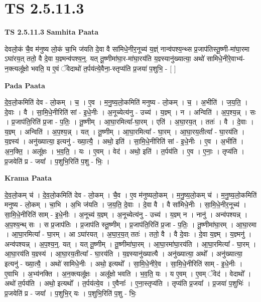 \documentclass[17pt]{extarticle}
\begin{document}
\section*{ TS 2.5.11.3 }

\textbf{TS 2.5.11.3 } \newline
\textbf{Samhita Paata} \newline

देवलो॒कं चै॒व म॑नुष्य लो॒कं चा॒भि ज॑यति दे॒वा वै सा॑मिधे॒नीर॒नूच्य॑ य॒ज्ञ्ं नान्व॑पश्य॒न्थ्स प्र॒जाप॑तिस्तू॒ष्णी-मा॑घा॒रमा ऽघा॑रय॒त् ततो॒ वै दे॒वा य॒ज्ञ्मन्व॑पश्य॒न्॒. यत् तू॒ष्णीमा॑घा॒र-मा॑घा॒रय॑ति य॒ज्ञ्स्यानु॑ख्यात्या॒ अथो॑ सामिधे॒नीरे॒वाभ्य॑-न॒क्त्यलू᳚क्षो भवति॒ य ए॒वं ॅवेदाथो॑ त॒र्पय॑त्ये॒वैना॒-स्तृप्य॑ति प्र॒जया॑ प॒शुभि॒ - [  ] \newline

\textbf{Pada Paata} \newline

दे॒व॒लो॒कमिति॑ देव - लो॒कम् । च॒ । ए॒व । म॒नु॒ष्य॒लो॒कमिति॑ मनुष्य - लो॒कम् । च॒ । अ॒भीति॑ । ज॒य॒ति॒ । दे॒वाः । वै । सा॒मि॒धे॒नीरिति॑ सां - इ॒धे॒नीः । अ॒नूच्येत्य॑नु - उच्य॑ । य॒ज्ञ्म् । न । अन्विति॑ । अ॒प॒श्य॒न्न् । सः । प्र॒जाप॑ति॒रिति॑ प्र॒जा - प॒तिः॒ । तू॒ष्णीम् । आ॒घा॒रमित्या᳚-घा॒रम् । एति॑ । अ॒घा॒रय॒त् । ततः॑ । वै । दे॒वाः । य॒ज्ञ्म् । अन्विति॑ । अ॒प॒श्य॒न्न् । यत् । तू॒ष्णीम् । आ॒घा॒रमित्या᳚ - घा॒रम् । आ॒घा॒रय॒तीत्या᳚ - घा॒रय॑ति । य॒ज्ञ्स्य॑ । अनु॑ख्यात्या॒ इत्यनु॑ - ख्या॒त्यै॒ । अथो॒ इति॑ । सा॒मि॒धे॒नीरिति॑ सां - इ॒धे॒नीः । ए॒व । अ॒भीति॑ । अ॒न॒क्ति॒ । अलू᳚क्षः । भ॒व॒ति॒ । यः । ए॒वम् । वेद॑ । अथो॒ इति॑ । त॒र्पय॑ति । ए॒व । ए॒नाः॒ । तृप्य॑ति । प्र॒जयेति॑ प्र - जया᳚ । प॒शुभि॒रिति॑ प॒शु - भिः॒ ।  \newline


\textbf{Krama Paata} \newline

दे॒व॒लो॒कम् च॑ । दे॒व॒लो॒कमिति॑ देव - लो॒कम् । चै॒व । ए॒व म॑नुष्यलो॒कम् । म॒नु॒ष्य॒लो॒कम् च॑ । म॒नु॒ष्य॒लो॒कमिति॑ मनुष्य - लो॒कम् । चा॒भि । अ॒भि ज॑यति । ज॒य॒ति॒ दे॒वाः । दे॒वा वै । वै सा॑मिधे॒नीः । सा॒मि॒धे॒नीर॒नूच्य॑ । सा॒मि॒धे॒नीरिति॑ साम् - इ॒धे॒नीः । अ॒नूच्य॑ य॒ज्ञ्म् । अ॒नूच्येत्य॑नु - उच्य॑ । य॒ज्ञ्म् न । नानु॑ । अन्व॑पश्यन्न् । अ॒प॒श्य॒न्थ् सः । स प्र॒जाप॑तिः । प्र॒जाप॑ति स्तू॒ष्णीम् । प्र॒जाप॑ति॒रिति॑ प्र॒जा - प॒तिः॒ । तू॒ष्णीमा॑घा॒रम् । आ॒घा॒रमा । आ॒घा॒रमित्या᳚ - घा॒रम् । आ ऽघा॑रयत् । अ॒घा॒र॒य॒त् ततः॑ । ततो॒ वै । वै दे॒वाः । दे॒वा य॒ज्ञ्म् । य॒ज्ञ्मनु॑ । अन्व॑पश्यन्न् । अ॒प॒श्य॒न्॒. यत् । यत् तू॒ष्णीम् । तू॒ष्णीमा॑घा॒रम् । आ॒घा॒रमा॑घा॒रय॑ति । आ॒घा॒रमित्या᳚ - घा॒रम् । आ॒घा॒रय॑ति य॒ज्ञ्स्य॑ । आ॒घा॒रय॒तीत्या᳚ - घा॒रय॑ति । य॒ज्ञ्स्यानु॑ख्यात्यै । अनु॑ख्यात्या॒ अथो᳚ । अनु॑ख्यात्या॒ इत्यनु॑ - ख्या॒त्यै॒ । अथो॑ सामिधे॒नीः । अथो॒ इत्यथो᳚ । सा॒मि॒धे॒नीरे॒व । सा॒मि॒धे॒नीरिति॑ साम् - इ॒धे॒नीः । ए॒वाभि । अ॒भ्य॑नक्ति । अ॒न॒क्त्यलू᳚क्षः । अलू᳚क्षो भवति । भ॒व॒ति॒ यः । य ए॒वम् । ए॒वम् ॅवेद॑ । वेदाथो᳚ । अथो॑ त॒र्पय॑ति । अथो॒ इत्यथो᳚ । त॒र्पय॑त्ये॒व । ए॒वैनाः᳚ । ए॒ना॒स्तृप्य॑ति । तृप्य॑ति प्र॒जया᳚ । प्र॒जया॑ प॒शुभिः॑ । प्र॒जयेति॑ प्र - जया᳚ । प॒शुभि॒र् यः । प॒शुभि॒रिति॑ प॒शु - भिः॒ \newline
\end{document}
